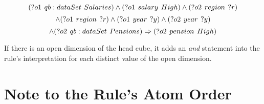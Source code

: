
\begin{minipage}{\textwidth}
$$
(?o1\hspace{0.4em}qb:dataSet\hspace{0.4em}Salaries) \land (?o1\hspace{0.4em}salary\hspace{0.4em}High) \land (?o2\hspace{0.4em}region\hspace{0.4em}?r)
$$
$$
\land (?o1\hspace{0.4em}region\hspace{0.4em}?r) \land (?o1\hspace{0.4em}year\hspace{0.4em}?y) \land (?o2\hspace{0.4em}year\hspace{0.4em}?y)
$$
$$
\land (?o2\hspace{0.4em}qb:dataSet\hspace{0.4em}Pensions) \Rightarrow (?o2\hspace{0.4em}pension\hspace{0.4em}High)
$$
\end{minipage}

If there is an open dimension of the head cube, it adds an \textit{and} statement into the rule's interpretation for each distinct value of the open dimension.


\section{Note to the Rule's Atom Order}






